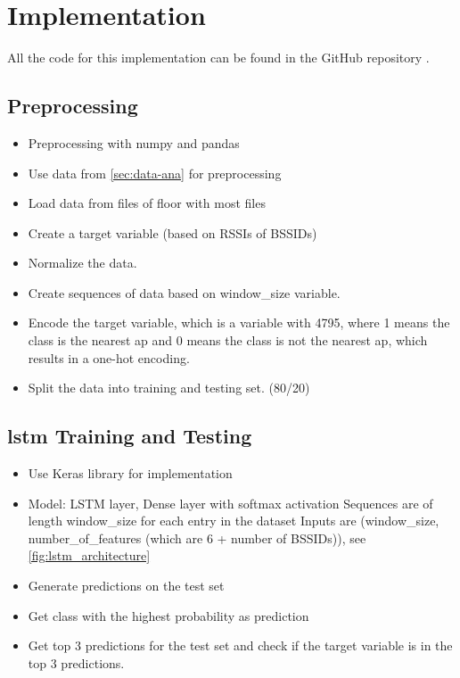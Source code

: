 \chapter{Implementation}\label{sec:implementation}

All the code for this implementation can be found in the GitHub repository \cite{github-repo}.

\section{Preprocessing}
\begin{itemize}
    \item Preprocessing with numpy and pandas
    \item Use data from \cref{sec:data-ana} for preprocessing
    \item Load data from files of floor with most files
    \item Create a target variable (based on RSSIs of BSSIDs)
    \item Normalize the data.
    \item Create sequences of data based on window\_size variable.
    \item Encode the target variable, which is a variable with 4795, where 1 means the class is the nearest \ac{ap} and 0 means the class is not the nearest \ac{ap}, which results in a one-hot encoding.
    \item Split the data into training and testing set. (80/20)
\end{itemize}

%     

\section{\ac{lstm} Training and Testing}
\begin{itemize}
    \item Use Keras library for implementation \cite{keras}
    \item Model: LSTM layer, Dense layer with softmax activation
    \subitem Sequences are of length window\_size for each entry in the dataset
    \subitem Inputs are (window\_size, number\_of\_features (which are 6 + number of BSSIDs)), see \cref{fig:lstm_architecture}
    \item Generate predictions on the test set
    \item Get class with the highest probability as prediction
    \item Get top 3 predictions for the test set and check if the target variable is in the top 3 predictions.
\end{itemize}

